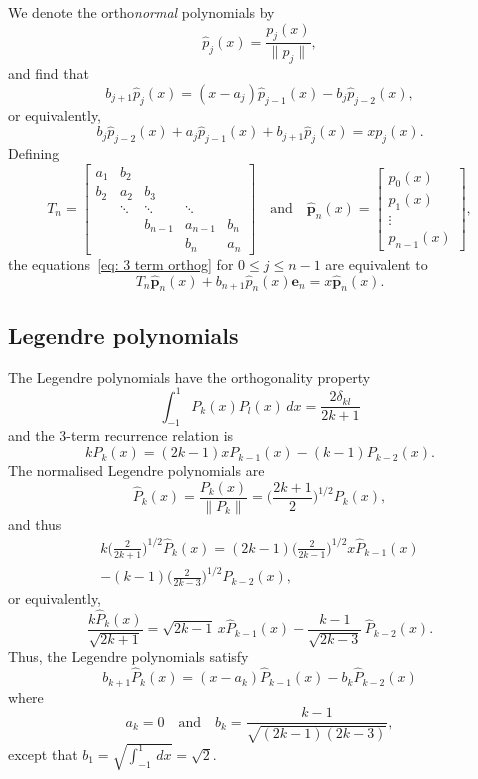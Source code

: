 \documentclass[12pt,a4paper]{article}
\newcommand{\hatvecp}{\hat{\boldsymbol{p}}}
\begin{document}
We denote the ortho\emph{normal} polynomials by
\[
\hat p_j(x)=\frac{p_j(x)}{\|p_j\|},
\]
and find that
\[
b_{j+1}\hat p_j(x)=(x-a_j)\hat p_{j-1}(x)-b_j\hat p_{j-2}(x),
\]
or equivalently,
\begin{equation}\label{eq: 3 term orthog}
b_j\hat p_{j-2}(x)+a_j\hat p_{j-1}(x)+b_{j+1}\hat p_j(x)=xp_j(x).
\end{equation}
Defining
\[
T_n=\begin{bmatrix}
a_1&b_2   &       &       &\\
b_2&a_2   &b_3    &       &\\
   &\ddots&\ddots &\ddots &\\
   &      &b_{n-1}&a_{n-1}&b_n\\
   &      &       &b_n    &a_n
\end{bmatrix}
\quad\text{and}\quad
\hatvecp_n(x)=\begin{bmatrix}p_0(x)\\ p_1(x)\\ \vdots\\ p_{n-1}(x)
\end{bmatrix},
\]
the equations~\eqref{eq: 3 term orthog} for $0\le j\le n-1$ are 
equivalent to
\[
T_n\hatvecp_n(x)+b_{n+1}\hat p_n(x)\boldsymbol{e}_n=x\hatvecp_n(x).
\]

\subsection{Legendre polynomials}
The Legendre polynomials have the orthogonality property
\begin{equation}\label{eq: legendre orthog}
\int_{-1}^1 P_k(x)P_l(x)\,dx=\frac{2\delta_{kl}}{2k+1}
\end{equation}
and the 3-term recurrence relation is
\begin{equation}\label{eq: legendre 3 term}
kP_k(x)=(2k-1)xP_{k-1}(x)-(k-1)P_{k-2}(x).
\end{equation}
The normalised Legendre polynomials are
\[
\hat P_k(x)=\frac{P_k(x)}{\|P_k\|}=\biggl(\frac{2k+1}{2}\biggr)^{1/2}
	P_k(x),
\]
and thus
\begin{multline*}
k\biggl(\frac{2}{2k+1}\biggr)^{1/2}\hat P_k(x)
	=(2k-1)\biggl(\frac{2}{2k-1}\biggr)^{1/2}x\hat P_{k-1}(x)\\
	-(k-1)\biggl(\frac{2}{2k-3}\biggr)^{1/2}\hat P_{k-2}(x),
\end{multline*}
or equivalently,
\[
\frac{k\hat P_k(x)}{\sqrt{2k+1}}=\sqrt{2k-1}\,x\hat P_{k-1}(x)
	-\frac{k-1}{\sqrt{2k-3}}\,\hat P_{k-2}(x).
\]
Thus, the Legendre polynomials satisfy
\[
b_{k+1}\hat P_k(x)=(x-a_k)\hat P_{k-1}(x)-b_k\hat P_{k-2}(x)
\]
where
\[
a_k=0\quad\text{and}\quad b_k=\frac{k-1}{\sqrt{(2k-1)(2k-3)}},
\]
except that $b_1=\sqrt{\int_{-1}^1\,dx}=\sqrt{2}$.
\end{document}
